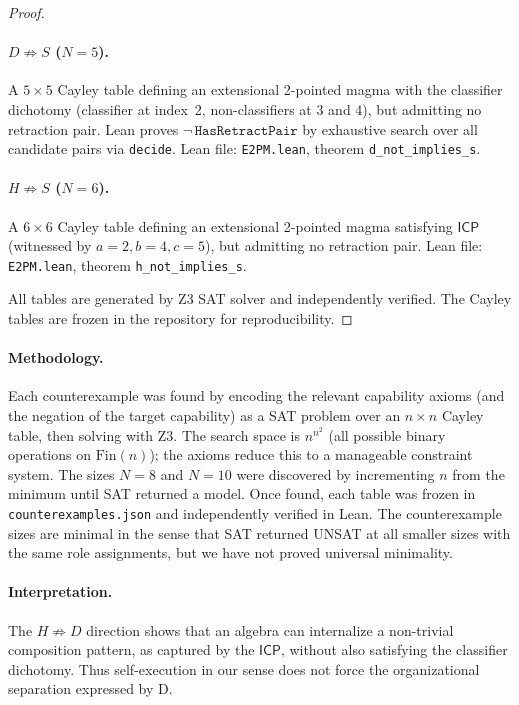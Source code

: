 \documentclass[sigconf,screen,review,anonymous]{acmart}
\newcommand{\ICP}{\textsf{ICP}}
\newcommand{\Fin}{\mathrm{Fin}}
\begin{document}
\begin{proof}
\paragraph{$D \not\Rightarrow S$ ($N\!=\!5$).}
A $5 \times 5$ Cayley table defining an extensional 2-pointed magma with the classifier dichotomy (classifier at index~2, non-classifiers at 3 and 4), but admitting no retraction pair. Lean proves $\neg\,\texttt{HasRetractPair}$ by exhaustive search over all candidate pairs via \texttt{decide}. Lean file: \texttt{E2PM.lean}, theorem \texttt{d\_not\_implies\_s}.

\paragraph{$H \not\Rightarrow S$ ($N\!=\!6$).}
A $6 \times 6$ Cayley table defining an extensional 2-pointed magma satisfying $\ICP$ (witnessed by $a\!=\!2, b\!=\!4, c\!=\!5$), but admitting no retraction pair. Lean file: \texttt{E2PM.lean}, theorem \texttt{h\_not\_implies\_s}.

All tables are generated by Z3 SAT solver and independently verified. The Cayley tables are frozen in the repository for reproducibility.
\end{proof}

\paragraph{Methodology.}
Each counterexample was found by encoding the relevant capability axioms (and the negation of the target capability) as a SAT problem over an $n \times n$ Cayley table, then solving with Z3. The search space is $n^{n^2}$ (all possible binary operations on $\Fin(n)$); the axioms reduce this to a manageable constraint system. The sizes $N\!=\!8$ and $N\!=\!10$ were discovered by incrementing $n$ from the minimum until SAT returned a model. Once found, each table was frozen in \texttt{counterexamples.json} and independently verified in Lean. The counterexample sizes are minimal in the sense that SAT returned UNSAT at all smaller sizes with the same role assignments, but we have not proved universal minimality.

\paragraph{Interpretation.}
The $H \not\Rightarrow D$ direction shows that an algebra can internalize a non-trivial composition pattern, as captured by the $\ICP$, without also satisfying the classifier dichotomy. Thus self-execution in our sense does not force the organizational separation expressed by D.
\end{document}
